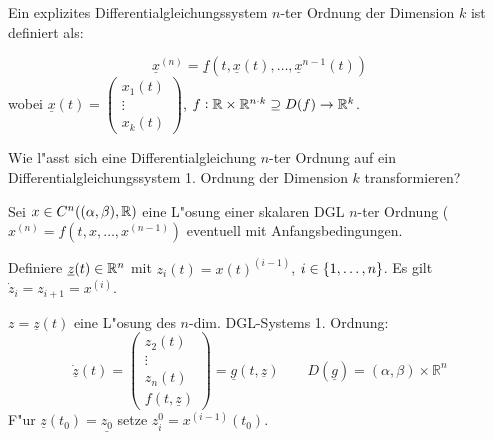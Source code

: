 \documentclass[9pt]{article}
\newcommand{\Rn}{\mathbb{R}^n}
\newcommand{\R}[1]{%
	\ifthenelse{\equal{#1}{}}
		{\mathbb{R}}
		{\mathbb{R}^#1}}%
\renewcommand{\vec}[1]{\underline{#1}}
\newenvironment{field}{}{\newpage}
\newif\ifnote
\newenvironment{note}{\notetrue}{\notefalse}
\newcommand{\localtag}{}
\newcommand{\globaltag}{}
\newcommand{\uuid}{}
\newcommand{\tags}[1]{
    \ifnote 
        \renewcommand{\localtag}{#1}
    \else
        \renewcommand{\globaltag}{#1}
    \fi 
    }
\newcommand{\xplain}[1]{\renewcommand{\uuid}{#1}}
\begin{document}
\begin{note}
	\xplain{UUID}
	\tags{definition, satz, DGL-System}
	
	\begin{field}  %
		Ein explizites Differentialgleichungssystem $n$-ter Ordnung der Dimension $k$ ist definiert als: 
	\end{field}
	
	\begin{field}  %
		\begin{equation*}
			\vec{x}^{(n)} = \vec{f}(t, \vec{x}(t), \dots, \vec{x}^{n-1}(t))
		\end{equation*}
		wobei $\vec{x}(t) = \begin{pmatrix} x_1(t)\\ \vdots\\ x_k(t)  \end{pmatrix}$,
		$f: \R{} \times \R{}^{n\cdot k} \supseteq D(f) \rightarrow \R{k}$. 
	\end{field}
		
	\begin{field}  %
		Wie l"asst sich eine Differentialgleichung $n$-ter Ordnung auf ein Differentialgleichungssystem 1. Ordnung der Dimension $k$ transformieren?
	\end{field}
	
	\begin{field}  %
		Sei $x  \in C^n((\alpha, \beta), \R{})$ eine L"osung einer skalaren DGL $n$-ter Ordnung
		($x^{(n)} = f(t,x, \dots, x^{(n-1)})$ eventuell mit Anfangsbedingungen. 
		 
		Definiere $\vec{z}(t) \in \R{n}$ mit $ z_i(t) = x(t)^{(i-1)}$,
		  $i\in \qty{1,\dots,n}$. Es gilt $\dot{z}_i = z_{i+1} = x^{(i)}$.
		
		$z = \vec{z}(t)$ eine L"osung des $n$-dim. DGL-Systems 1. Ordnung:
		\footnotesize
		\begin{equation*}
			\vec{\dot{z}}(t) = \begin{pmatrix}z_2(t) \\ \vdots \\ z_n(t) \\ f(t, \vec{z})  \end{pmatrix} = \vec{g}(t,\vec{z}) \qquad D(\vec{g}) = (\alpha,\beta) \times \Rn
		\end{equation*} 
		\normalsize
		F"ur $\vec{z}(t_0) = \vec{z_0}$  setze  $z^0_i = x^{(i-1)}(t_0)$. 
	\end{field}
\end{note}
\end{document}
